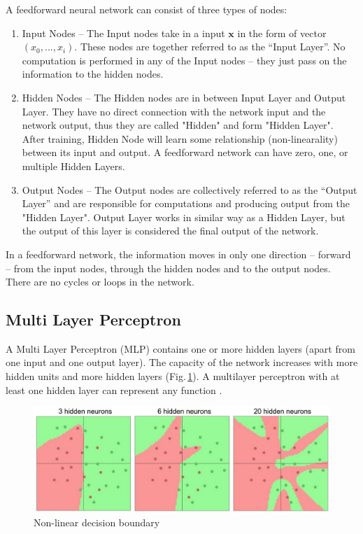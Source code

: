 \noindent A feedforward neural network can consist of three types of nodes:

\begin{enumerate}
\item Input Nodes – The Input nodes take in a input $\mathbf{x}$ in the form of vector $(x_0,...,x_i)$. These nodes are together referred to as the “Input Layer”. No computation is performed in any of the Input nodes – they just pass on the information to the hidden nodes.

\item Hidden Nodes – The Hidden nodes are in between Input Layer and Output Layer. They have no direct connection with the network input and the network output, thus they are called "Hidden" and form "Hidden Layer". After training, Hidden Node will learn some relationship (non-linearality) between its input and output. A feedforward network can have zero, one, or multiple Hidden Layers.

\item Output Nodes – The Output nodes are collectively referred to as the “Output Layer” and are responsible for computations and producing output from the "Hidden Layer". Output Layer works in similar way as a Hidden Layer, but the output of this layer is considered the final output of the network.

\end{enumerate}

In a feedforward network, the information moves in only one direction – forward – from the input nodes, through the hidden nodes and to the output nodes. There are no cycles or loops in the network.


\subsection{Multi Layer Perceptron}
A Multi Layer Perceptron (MLP) contains one or more hidden layers (apart from one input and one output layer). The capacity of the network increases with more hidden units and more hidden layers (Fig.\,\ref{anyfunction}). A multilayer perceptron with at least one hidden layer can represent any function \citep{Cybenko1989}.

\begin{figure}[h]
	\centering
	\includegraphics[scale=0.5]{Figs/anyfunction.png}
    \caption{Non-linear decision boundary}
    \label{anyfunction}
\end{figure}


